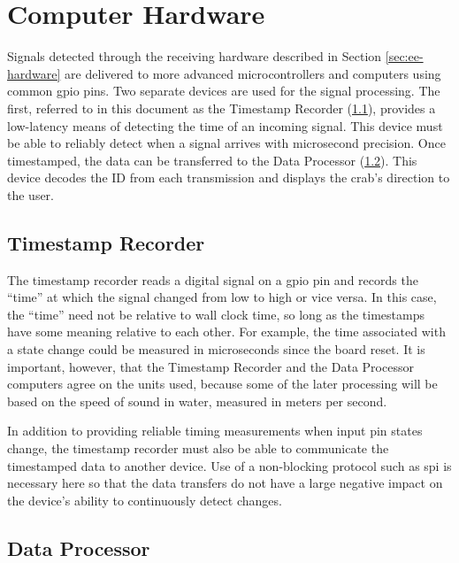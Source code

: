 \documentclass[12pt]{article}
\begin{document}
\section{Computer Hardware}\label{sec:cs-hardware}

Signals detected through the receiving hardware described in
Section \ref{sec:ee-hardware} are delivered to more advanced microcontrollers
and computers using common \gls{gpio} pins.
Two separate devices are used for the signal processing.
The first,
referred to in this document as the Timestamp Recorder (\ref{sec:ts-rec}),
provides a
low-latency means of detecting the time of an incoming signal.
This device must be able to reliably detect when a signal arrives with
microsecond precision.
Once timestamped, the data can be transferred to the
Data Processor (\ref{sec:data-processor}).
This device decodes the ID from each transmission and displays the crab's
direction to the user.

\subsection{Timestamp Recorder}\label{sec:ts-rec}

The timestamp recorder reads a digital signal on a \gls{gpio} pin and records
the ``time'' at which the signal changed from low to high or vice versa.
In this case, the ``time'' need not be relative to wall clock time, so long
as the timestamps have some meaning relative to each other.
For example, the time associated with a state change could be measured in
microseconds since the board reset.
It is important, however, that the Timestamp Recorder and the Data Processor
computers agree on the units used, because some of the later processing will be
based on the speed of sound in water, measured in meters per second.

In addition to providing reliable timing measurements when input pin states
change, the timestamp recorder must also be able to communicate the timestamped
data to another device.
Use of a non-blocking protocol such as \gls{spi} is
necessary here so that the data transfers do not have a large negative impact
on the device's ability to continuously detect changes.

\subsection{Data Processor}\label{sec:data-processor}
\end{document}
